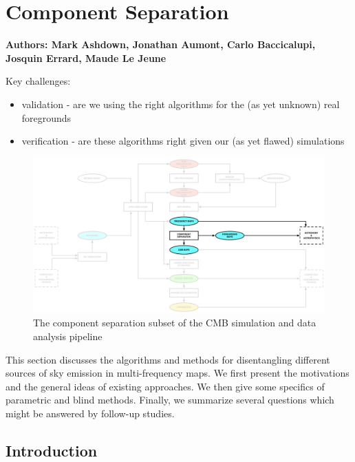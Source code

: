           
\section{Component Separation}

\textbf{ Authors: Mark Ashdown, Jonathan Aumont, Carlo Baccicalupi, Josquin Errard, Maude Le Jeune}

Key challenges:
\begin{itemize}
\item validation - are we using the right algorithms for the (as yet unknown) real foregrounds
\item verification - are these algorithms right given our (as yet flawed) simulations
\end{itemize}

\begin{figure}[htbp]
\centering
\includegraphics[width=1\textwidth]{Analysis/cs}
\caption{The component separation subset of the CMB simulation and data analysis pipeline}
\label{fig:general_comp_sep_scheme}
\end{figure}

This section discusses the algorithms and methods for disentangling different sources of sky emission in multi-frequency maps. 
We first present the motivations and the general ideas of existing approaches. 
We then give some specifics of parametric and blind methods. 
Finally, we summarize several questions which might be answered by follow-up studies.

\subsection{Introduction}

